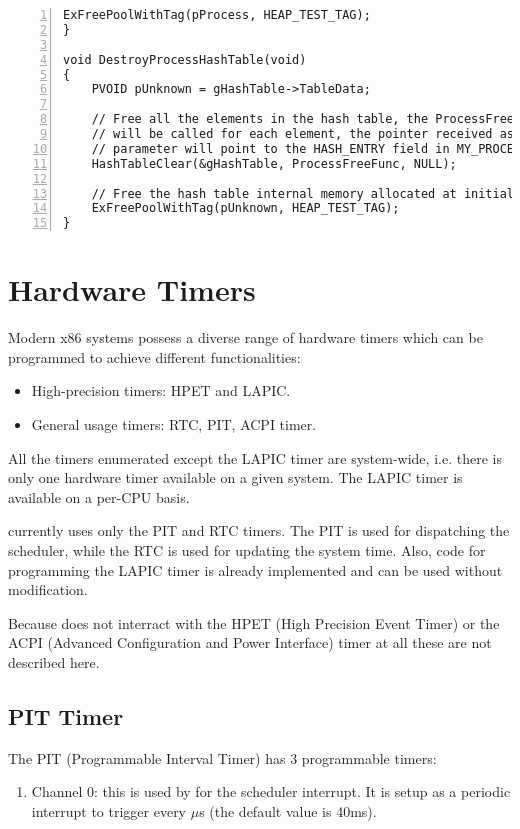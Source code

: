 \begin{appendices}
\begin{lstlisting}[caption={Hash Destruction Example},label={lst:HashDestEg},numbers=left]
	ExFreePoolWithTag(pProcess, HEAP_TEST_TAG);
}

void DestroyProcessHashTable(void)
{
	PVOID pUnknown = gHashTable->TableData;

	// Free all the elements in the hash table, the ProcessFreeFunc function
	// will be called for each element, the pointer received as the first
	// parameter will point to the HASH_ENTRY field in MY_PROCESS
	HashTableClear(&gHashTable, ProcessFreeFunc, NULL);

	// Free the hash table internal memory allocated at initialization
	ExFreePoolWithTag(pUnknown, HEAP_TEST_TAG);
}
\end{lstlisting}

\section{Hardware Timers}

Modern x86 systems possess a diverse range of hardware timers which can be programmed to achieve different
functionalities:
\begin{itemize}
	\item High-precision timers: HPET and LAPIC.
	\item General usage timers: RTC, PIT, ACPI timer.
\end{itemize}

All the timers enumerated except the LAPIC timer are system-wide, i.e. there is only one hardware timer available on a
given system. The LAPIC timer is available on a per-CPU basis.

\projectname currently uses only the PIT and RTC timers. The PIT is used for dispatching the scheduler, while the RTC is
used for updating the system time. Also, code for programming the LAPIC timer is already implemented and can be used
without modification.

Because \projectname does not interract with the HPET (High Precision Event Timer) or the ACPI (Advanced Configuration
and Power Interface) timer at all these are not described here.

\subsection{PIT Timer}

The PIT (Programmable Interval Timer) has 3 programmable timers:
\begin{enumerate}
	\item Channel 0: this is used by \projectname for the scheduler interrupt. It is setup as a periodic interrupt to 
trigger every  $\mu$s (the default value is 40ms).


\end{enumerate}
\end{appendices}
